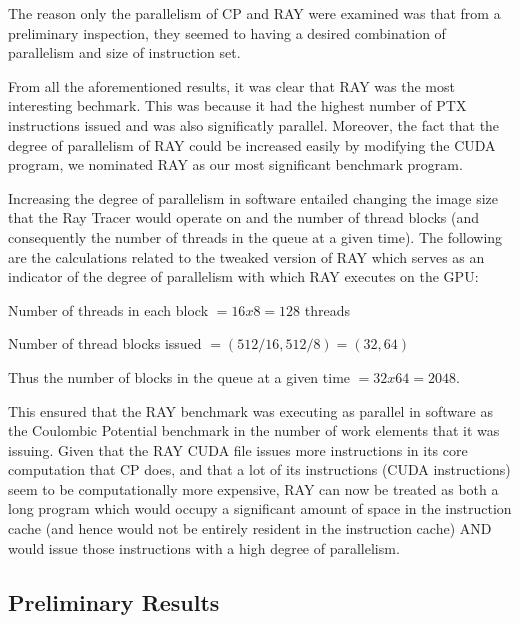 The reason only the parallelism of CP and RAY were examined was that from a preliminary inspection, they seemed to having a desired combination of parallelism and size of instruction set. 

From all the aforementioned results, it was clear that RAY was the most interesting bechmark. This was because it had the highest number of PTX instructions issued and was also significatly parallel. Moreover, the fact that the degree of parallelism of RAY could be increased easily by modifying the CUDA program, we nominated RAY as our most significant benchmark program. 

Increasing the degree of parallelism in software entailed changing the image size that the Ray Tracer would operate on and the number of thread blocks (and consequently the number of threads in the queue at a given time). The following are the calculations related to the tweaked version of RAY which serves as an indicator of the degree of parallelism with which RAY executes on the GPU:

Number of threads in each block $= 16 x 8 = 128$ threads

Number of thread blocks issued $= (512/16, 512/8) = (32, 64)$

Thus the number of blocks in the queue at a given time $= 32 x 64 = 2048.$

This ensured that the RAY benchmark was executing as parallel in software as the Coulombic Potential benchmark in the number of work elements that it was issuing. Given that the RAY CUDA file issues more instructions in its core computation that CP does, and that a lot of its instructions (CUDA instructions) seem to be computationally more expensive, RAY can now be treated as both a long program which would occupy a significant amount of space in the instruction cache (and hence would not be entirely resident in the instruction cache) AND would issue those instructions with a high degree of parallelism.

\subsection{Preliminary Results}

